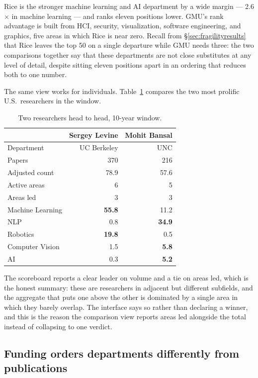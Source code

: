 \documentclass[11pt]{article}
\begin{document}
Rice is the stronger machine learning and AI department by a wide margin ---
2.6$\times$ in machine learning --- and ranks eleven positions lower. GMU's rank
advantage is built from HCI, security, visualization, software engineering, and
graphics, five areas in which Rice is near zero. Recall from
\S\ref{sec:fragilityresults} that Rice leaves the top 50 on a single departure
while GMU needs three: the two comparisons together say that these departments
are not close substitutes at any level of detail, despite sitting eleven
positions apart in an ordering that reduces both to one number.

The same view works for individuals. Table~\ref{tab:compareresearcher} compares
the two most prolific U.S.\ researchers in the window.

\begin{table}[t]
\centering
\caption{Two researchers head to head, 10-year window.}
\label{tab:compareresearcher}
\begin{tabular}{lrr}
\toprule
& Sergey Levine & Mohit Bansal \\
\midrule
Department       & UC Berkeley & UNC \\
Papers           & 370   & 216 \\
Adjusted count   & 78.9  & 57.6 \\
Active areas     & 6     & 5 \\
Areas led        & 3     & 3 \\
\midrule
Machine Learning & \textbf{55.8} & 11.2 \\
NLP              & 0.8   & \textbf{34.9} \\
Robotics         & \textbf{19.8} & 0.5 \\
Computer Vision  & 1.5   & \textbf{5.8} \\
AI               & 0.3   & \textbf{5.2} \\
\bottomrule
\end{tabular}
\end{table}

The scoreboard reports a clear leader on volume and a tie on areas led, which
is the honest summary: these are researchers in adjacent but different
subfields, and the aggregate that puts one above the other is dominated by a
single area in which they barely overlap. The interface says so rather than
declaring a winner, and this is the reason the comparison view reports areas
led alongside the total instead of collapsing to one verdict.

\subsection{Funding orders departments differently from publications}
\label{sec:nsf}
\end{document}
